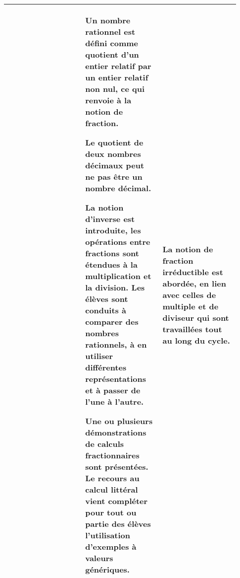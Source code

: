 {\begin{tabular}{|p{0.31\linewidth}|p{0.31\linewidth}|p{0.31\linewidth}|}
&
Un nombre rationnel est défini comme
quotient d’un entier relatif par un entier relatif
non nul, ce qui renvoie à la notion de
fraction.\par 
Le quotient de deux nombres décimaux peut
ne pas être un nombre décimal.\par 
La notion d’inverse est introduite, les
opérations entre fractions sont étendues à la
multiplication et la division. Les élèves sont
conduits à comparer des nombres
rationnels, à en utiliser différentes
représentations et à passer de l’une à l’autre.\par
Une ou plusieurs démonstrations de calculs
fractionnaires sont présentées. Le recours au
calcul littéral vient compléter pour tout ou
partie des élèves l’utilisation d’exemples
à valeurs génériques.
&
La notion de fraction irréductible est
abordée, en lien avec celles de multiple et de
diviseur qui sont travaillées tout au long du
cycle.
\\\hline
\end{tabular}
\renewcommand{\arraystretch}{1}
}